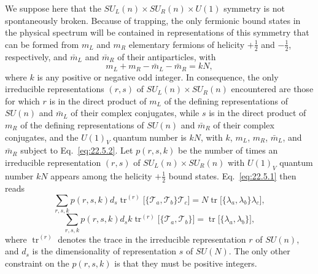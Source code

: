 We suppose here that the $SU_L(n)\times SU_R(n)\times U(1)$ symmetry is not
spontaneously broken. Because of trapping, the only fermionic bound states
in the physical spectrum will be contained in representations of this
symmetry that can be formed from $m_L$ and $m_R$ elementary fermions of
helicity $+\frac12$ and $-\frac12$, respectively, and $\bar m_L$ and
$\bar m_R$ of their antiparticles, with
\begin{equation}
 m_L+m_R-\bar m_L-\bar m_R=kN,
 \tag{22.5.2}\label{eq:22.5.2}
\end{equation}
where $k$ is any positive or negative odd integer. In consequence, the only
irreducible representations $(r,s)$ of $SU_L(n)\times SU_R(n)$ encountered
are those for which $r$ is in the direct product of $m_L$ of the defining
representations of $SU(n)$ and $\bar m_L$ of their complex conjugates,
while $s$ is in the direct product of $m_R$ of the defining representations
of $SU(n)$ and $\bar m_R$ of their complex conjugates, and the $U(1)_V$
quantum number is $kN$, with $k$, $m_L$, $m_R$, $\bar m_L$, and $\bar m_R$
subject to Eq.~\eqref{eq:22.5.2}. Let $p(r,s,k)$ be the number of times an
irreducible representation $(r,s)$ of $SU_L(n)\times SU_R(n)$ with $U(1)_V$
quantum number $kN$ appears among the helicity $+\frac12$ bound states.
Eq.~\eqref{eq:22.5.1} then reads
\begin{equation}
 \sum_{r,s,k}p(r,s,k)d_s
 \operatorname{tr}^{(r)}
 \bigl[\{\mathcal T_a,\mathcal T_b\}\mathcal T_c\bigr]
 =
 N\operatorname{tr}\bigl[\{\lambda_a,\lambda_b\}\lambda_c\bigr],
 \tag{22.5.3}\label{eq:22.5.3}
\end{equation}
\begin{equation}
 \sum_{r,s,k}p(r,s,k)d_s k
 \operatorname{tr}^{(r)}
 \bigl[\{\mathcal T_a,\mathcal T_b\}\bigr]
 =
 \operatorname{tr}\bigl[\{\lambda_a,\lambda_b\}\bigr],
 \tag{22.5.4}\label{eq:22.5.4}
\end{equation}
where $\operatorname{tr}^{(r)}$ denotes the trace in the irreducible
representation $r$ of $SU(n)$, and $d_s$ is the dimensionality of
representation $s$ of $SU(N)$. The only other constraint on the $p(r,s,k)$
is that they must be positive integers.

